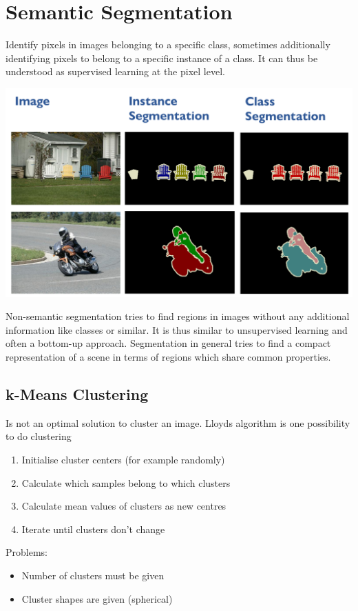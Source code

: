 \section{Semantic Segmentation}
Identify pixels in images belonging to a specific class, sometimes additionally identifying pixels to belong to a specific instance of a class.
It can thus be understood as supervised learning at the pixel level.
\begin{center}
	\includegraphics[width=0.7\linewidth]{img/semantic_segmentation}
\end{center}
Non-semantic segmentation tries to find regions in images without any additional information like classes or similar.
It is thus similar to unsupervised learning and often a bottom-up approach.
Segmentation in general tries to find a compact representation of a scene in terms of regions which share common properties.

\subsection{k-Means Clustering}
Is not an optimal solution to cluster an image. Lloyds algorithm is one possibility to do clustering
\begin{enumerate}
	\item[-\ ] Initialise cluster centers (for example randomly)
	\item Calculate which samples belong to which clusters
	\item Calculate mean values of clusters as new centres
	\item[-\ ] Iterate until clusters don't change
\end{enumerate}
Problems:
\begin{itemize}
	\item Number of clusters must be given
	\item Cluster shapes are given (spherical)
\end{itemize}

